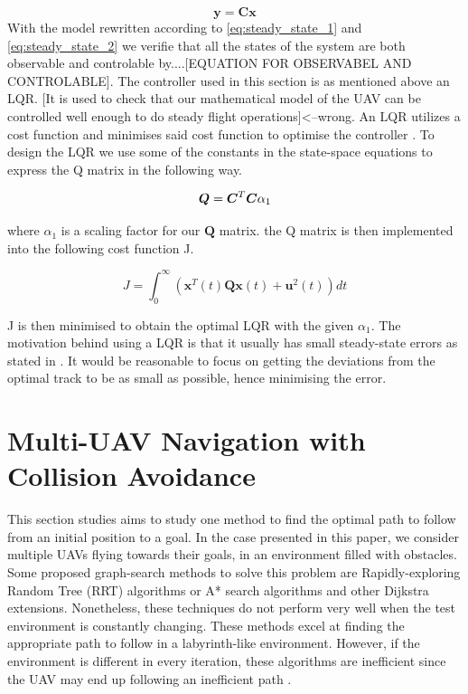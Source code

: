 \documentclass[journal]{IEEEtran}
\begin{document}
	\begin{equation} \label{eq:steady_state_2}
	\bm{y} = \bm{C} \bm{x}
	\end{equation}
	With the model rewritten according to \ref{eq:steady_state_1} and \ref{eq:steady_state_2} we verifie that all the states of the system are both observable and controlable by....[EQUATION FOR OBSERVABEL AND CONTROLABLE]. The controller used in this section is as mentioned above an LQR. [It is used to check that our mathematical model of the UAV can be controlled well enough to do steady flight operations]<--wrong.  An LQR utilizes a cost function and minimises said cost function to optimise the controller \cite{bokLQ}. To design the LQR we use some of the constants in the state-space equations to express the Q matrix in the following way.
	
	\begin{equation}
	\bm{Q}=\bm{C^}{T}\bm{C}\alpha_{1}
	\end{equation}
	
	where $\alpha_{1}$ is a scaling factor for our $\bm{Q}$ matrix.
	the Q matrix is then implemented into the following cost function J.
	
	\begin{equation}
	J = \int_{0}^{\infty} (\bm{x}^{T}(t)\bm{Q}\bm{x}(t)+\bm{u}^2(t)) dt
	\end{equation}
	
	 J is then minimised to obtain the optimal LQR with the given $\alpha_{1}$. The motivation behind using a LQR is that it usually has small steady-state errors as stated in \cite{lqr_error}. It would be reasonable to focus on getting the deviations from the optimal track to be as small as possible, hence minimising the error.   
	
		
	\section{Multi-UAV Navigation with Collision Avoidance}\label{navigation}
		This section studies aims to study one method to find the optimal path to follow from an initial position to a goal. In the case presented in this paper, we consider multiple UAVs flying towards their goals, in an environment filled with obstacles. Some proposed graph-search methods to solve this problem are Rapidly-exploring Random Tree (RRT) algorithms or A* search algorithms and other Dijkstra extensions.	Nonetheless, these techniques do not perform very well when the test environment is constantly changing. These methods excel at finding the appropriate path to follow in a labyrinth-like environment. However, if the environment is different in every iteration, these algorithms are inefficient since the UAV may end up following an inefficient path \cite{lavalle_rrt, lavalle_astar}.\\
 	
\end{document}

